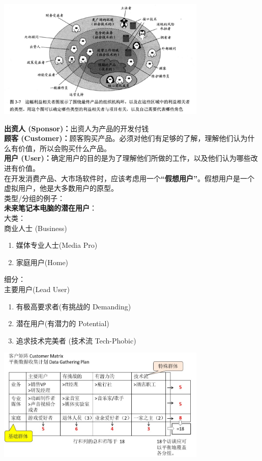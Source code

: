 \includegraphics[width=10cm]{7_利益相关者1.png}

\textbf{出资人 (Sponsor)：}出资人为产品的开发付钱\\
\textbf{顾客
(Customer)：}顾客购买产品。必须对他们有足够的了解，理解他们认为什么有价值，所以会购买什么产品。\\
\textbf{用户
(User)：}确定用户的目的是为了理解他们所做的工作，以及他们认为哪些改进有价值。\\
在开发消费产品、大市场软件时，应该考虑用一个\textbf{``假想用户''}。假想用户是一个虚拟用户，他是大多数用户的原型。\\
类型/分组的例子：\\
\textbf{未来笔记本电脑的潜在用户}：\\
大类：\\
商业人士 (Business)

\begin{enumerate}
\tightlist
\item
  媒体专业人士(Media Pro)
\item
  家庭用户(Home)
\end{enumerate}

细分：\\
主要用户(Lead User)

\begin{enumerate}
\tightlist
\item
  有极高要求者(有挑战的 Demanding)
\item
  潜在用户(有潜力的 Potential)
\item
  追求技术完美者 (技术流 Tech-Phobic)
\end{enumerate}


\includegraphics[width=10cm]{CustomerMatrixScreenshot_2022-12-16_180326.jpg}

